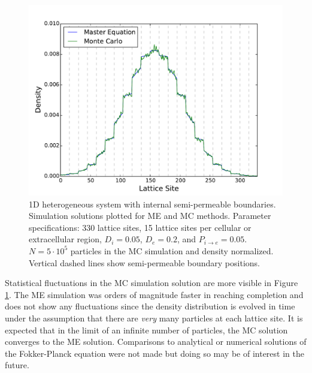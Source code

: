 	\begin{figure}[h]
		\centering
		\includegraphics[width=1.0\linewidth]{../images/1D/11U_heterogeneous_plots_1D}
		\caption{1D heterogeneous system with internal semi-permeable boundaries. Simulation solutions plotted for ME and MC methods. Parameter specifications: 330 lattice sites, 15 lattice sites per cellular or extracellular region, $ D_i = 0.05 $, $ D_e = 0.2 $, and $ P_{i\rightarrow e} = 0.05 $. $ N = 5 \cdot 10^5 $ particles in the MC simulation and density normalized. Vertical dashed lines show semi-permeable boundary positions.}
		\label{fig:11U_heterogeneous_plots_1D}
	\end{figure}
	
	Statistical fluctuations in the MC simulation solution are more visible in Figure \ref{fig:11U_heterogeneous_plots_1D}. The ME simulation was orders of magnitude faster in reaching completion and does not show any fluctuations since the density distribution is evolved in time under the assumption that there are \textsl{very} many particles at each lattice site. It is expected that in the limit of an infinite number of particles, the MC solution converges to the ME solution. Comparisons to analytical or numerical solutions of the Fokker-Planck equation were not made but doing so may be of interest in the future.
	
